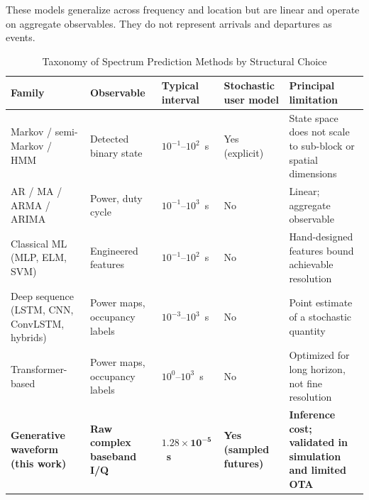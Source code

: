 \documentclass[lettersize,journal]{IEEEtran}
\begin{document}
These models generalize across frequency and location but are linear and
operate on aggregate observables.
They do not represent arrivals and departures as events.

\begin{table}[t]
\centering
\caption{Taxonomy of Spectrum Prediction Methods by Structural Choice}
\label{tab:taxonomy}
\renewcommand{\arraystretch}{1.25}
\begin{tabular}{@{}p{3.0cm}p{3.4cm}p{2.6cm}p{2.2cm}p{4.0cm}@{}}
\toprule
\textbf{Family} & \textbf{Observable} & \textbf{Typical interval} &
\textbf{Stochastic user model} & \textbf{Principal limitation} \\
\midrule
Markov / semi-Markov / HMM &
Detected binary state &
$10^{-1}$--$10^{2}$~s &
Yes (explicit) &
State space does not scale to sub-block or spatial dimensions \\
AR / MA / ARMA / ARIMA &
Power, duty cycle &
$10^{-1}$--$10^{3}$~s &
No &
Linear; aggregate observable \\
Classical ML (MLP, ELM, SVM) &
Engineered features &
$10^{-1}$--$10^{2}$~s &
No &
Hand-designed features bound achievable resolution \\
Deep sequence (LSTM, CNN, ConvLSTM, hybrids) &
Power maps, occupancy labels &
$10^{-3}$--$10^{3}$~s &
No &
Point estimate of a stochastic quantity \\
Transformer-based &
Power maps, occupancy labels &
$10^{0}$--$10^{3}$~s &
No &
Optimized for long horizon, not fine resolution \\
\textbf{Generative waveform (this work)} &
\textbf{Raw complex baseband I/Q} &
$\mathbf{1.28\times10^{-5}}$~\textbf{s} &
\textbf{Yes (sampled futures)} &
\textbf{Inference cost; validated in simulation and limited OTA} \\
\bottomrule
\end{tabular}
\end{table}

\end{document}
